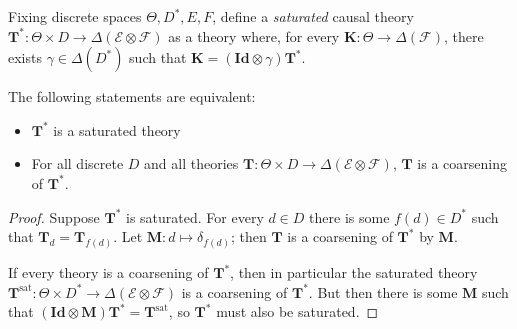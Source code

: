 \begin{theorem}
Fixing discrete spaces $\Theta,D^*,E,F$, define a \emph{saturated} causal theory $\mathbf{T}^*:\Theta\times D\to \Delta(\mathcal{E}\otimes\mathcal{F})$ as a theory where, for every $\mathbf{K}:\Theta\to \Delta(\mathcal{F})$, there exists $\gamma\in \Delta(D^*)$ such that $\mathbf{K}=(\mathbf{Id}\otimes \gamma)\mathbf{T}^*$.

The following statements are equivalent:
\begin{itemize}
 \item $\mathbf{T}^*$ is a saturated theory
 \item For all discrete $D$ and all theories $\mathbf{T}:\Theta\times D\to \Delta(\mathcal{E}\otimes\mathcal{F})$, $\mathbf{T}$ is a coarsening of $\mathbf{T}^*$.
\end{itemize}
\end{theorem}

\begin{proof}
Suppose $\mathbf{T}^*$ is saturated. For every $d\in D$ there is some $f(d)\in D^*$ such that $\mathbf{T}_d = \mathbf{T}_{f(d)}$. Let $\mathbf{M}:d\mapsto \delta_{f(d)}$; then $\mathbf{T}$ is a coarsening of $\mathbf{T}^*$ by $\mathbf{M}$.

If every theory is a coarsening of $\mathbf{T}^*$, then in particular the saturated theory $\mathbf{T}^{\mathrm{sat}}:\Theta\times D^*\to \Delta(\mathcal{E}\otimes\mathcal{F})$ is a coarsening of $\mathbf{T}^*$. But then there is some $\mathbf{M}$ such that $(\mathbf{Id}\otimes \mathbf{M})\mathbf{T}^* = \mathbf{T}^{\mathrm{sat}}$, so $\mathbf{T}^*$ must also be saturated. 
\end{proof}




